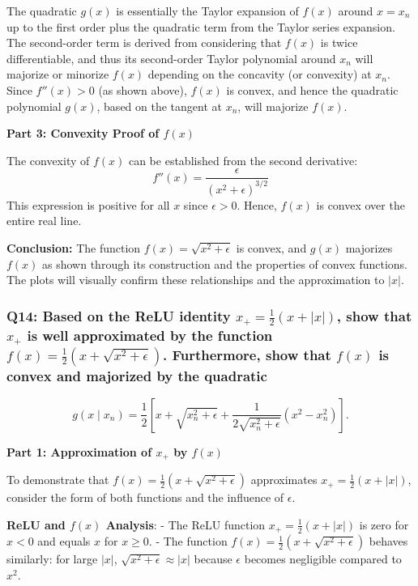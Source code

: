 \documentclass[8pt]{article}
\begin{document}
The quadratic \( g(x) \) is essentially the Taylor expansion of \( f(x) \) around \( x = x_n \) up to the first order plus the quadratic term from the Taylor series expansion. The second-order term is derived from considering that \( f(x) \) is twice differentiable, and thus its second-order Taylor polynomial around \( x_n \) will majorize or minorize \( f(x) \) depending on the concavity (or convexity) at \( x_n \). Since \( f''(x) > 0 \) (as shown above), \( f(x) \) is convex, and hence the quadratic polynomial \( g(x) \), based on the tangent at \( x_n \), will majorize \( f(x) \).

\textbf{Part 3: Convexity Proof of \( f(x) \)}

The convexity of \( f(x) \) can be established from the second derivative:
\[ f''(x) = \frac{\epsilon}{(x^2 + \epsilon)^{3/2}} \]
This expression is positive for all \( x \) since \( \epsilon > 0 \). Hence, \( f(x) \) is convex over the entire real line.

\textbf{Conclusion:} The function \( f(x) = \sqrt{x^2 + \epsilon} \) is convex, and \( g(x) \) majorizes \( f(x) \) as shown through its construction and the properties of convex functions. The plots will visually confirm these relationships and the approximation to \( |x| \).

\subsubsection*{Q14: Based on the ReLU identity \( x_+ = \frac{1}{2} (x + |x|) \), show that \( x_+ \) is well approximated by the function \( f(x) = \frac{1}{2} (x + \sqrt{x^2 + \epsilon}) \). Furthermore, show that \( f(x) \) is convex and majorized by the quadratic}
\[
g(x \mid x_n) = \frac{1}{2} \left[ x + \sqrt{x_n^2 + \epsilon} + \frac{1}{2\sqrt{x_n^2 + \epsilon}} (x^2 - x_n^2) \right].
\]

\textbf{Part 1: Approximation of \( x_+ \) by \( f(x) \)}

To demonstrate that \( f(x) = \frac{1}{2} (x + \sqrt{x^2 + \epsilon}) \) approximates \( x_+ = \frac{1}{2} (x + |x|) \), consider the form of both functions and the influence of \(\epsilon\).

\textbf{ReLU and \( f(x) \) Analysis}:
- The ReLU function \( x_+ = \frac{1}{2} (x + |x|) \) is zero for \( x < 0 \) and equals \( x \) for \( x \geq 0 \).
- The function \( f(x) = \frac{1}{2} (x + \sqrt{x^2 + \epsilon}) \) behaves similarly: for large \( |x| \), \( \sqrt{x^2 + \epsilon} \approx |x| \) because \(\epsilon\) becomes negligible compared to \(x^2\).
\end{document}

